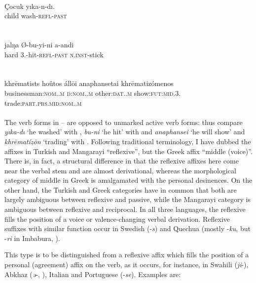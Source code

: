 \ea\label{ex:E16}
\\
\gll Çocuk  yıka-n-dı.\\
 child  wash-\textsc{refl}-\textsc{past}\\
\\
\z
\noindent \ea\label{ex:E17}
 \\
\gll jalŋa  Ø-bu-yi-ni  a-andi\\
hard  3.\glsg-hit-\textsc{refl}-\textsc{past}  \textsc{n}.\textsc{inst}-stick\\
\\
\z
\noindent \ea\label{ex:E18}
\\
\gll   khr\=ematists  hoûtos áll\=oi  anaphansetai  khr\=ematizómenos\\
 businessman:\textsc{nom}.\glsg.\textsc{m}  \textsc{d}:\textsc{nom}.\glsg.\textsc{m}  other:\textsc{dat}.\glsg.\textsc{m} {show:\textsc{fut}:\textsc{mid}.3.\glsg} trade:\textsc{part}.\textsc{prs}.\textsc{mid}:\textsc{nom}.\glsg.\textsc{m}\\
\\
\z
\noindent The verb forms in -- are opposed to unmarked active verb forms: thus compare \textit{yıka-dı} ‘he washed’ with , \textit{bu-ni} ‘he hit’ with  and \textit{anaphansei} ‘he will show’ and \textit{khr\=ematíz\=on} ‘trading’ with . Following traditional terminology, I have dubbed the affixes in Turkish and Mangarayi ``reflexive'', but the Greek affix ``middle (voice)''. There is, in fact, a structural difference in that the reflexive affixes here come near the verbal stem and are almost derivational, whereas the morphological category of middle in Greek is amalgamated with the personal desinences. On the other hand, the Turkish and Greek categories have in common that both are largely ambiguous between reflexive and passive, while the Mangarayi category is ambiguous between reflexive and reciprocal. In all three languages, the reflexive fills the position of a voice or valence-changing verbal derivation. Reflexive suffixes with similar function occur in Swedish (-\textit{s}) and Quechua (mostly -\textit{ku}, but -\textit{ri} in Imbabura, \citealt[90f]{Cole1982}).

This type is to be distinguished from a reflexive affix which fills the position of a personal (agreement) affix on the verb, as it occurs, for instance, in Swahili (\textit{ji}{}-), Abkhaz (\textit{ə}{}-, \citealt[77]{Hewitt1979}), Italian and Portuguese (-\textit{se}). Examples are:

